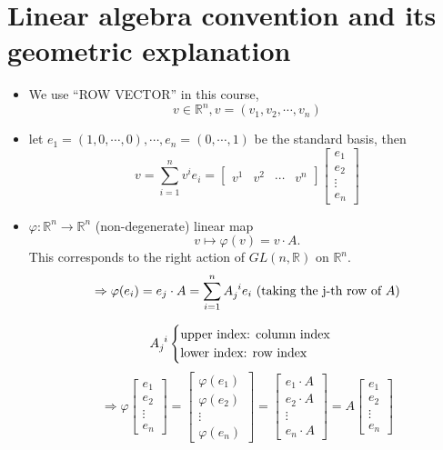 \section{Linear algebra convention and its geometric explanation}
\begin{itemize}
    \item We use ``ROW VECTOR'' in this course, \ie\
    \[v\in \mathbb{R}^n, v=(v_1,v_2,\cdots,v_n)\]
    \item let $e_1=(1,0,\cdots,0),\cdots,e_n=(0,\cdots,1)$ be the standard basis, then 
    \[v=\sum_{i=1}^nv^i e_i=
    \begin{bmatrix}
        v^1& v^2& \cdots & v^n
    \end{bmatrix}
    \begin{bmatrix}
        e_1\\
        e_2\\
        \vdots\\
        e_n
    \end{bmatrix}
    \]
    \item $\varphi\colon \mathbb{R}^n\to \mathbb{R}^n$ (non-degenerate) linear map
    \[v\mapsto \varphi(v)=v\cdot A.\]
    This corresponds to the right action of $GL(n,\mathbb{R})$ on $\mathbb{R}^n$.
    \[\Rightarrow \varphi(e_i)=e_j \cdot A=\sum_{i=1}^n A\indices{_j^i}e_i\text{ (taking the j-th row of }A\text{)}\]
    
    \[A\indices{_j^i}\begin{cases}
        \text{upper index: column index}\\
        \text{lower index: row index}
    \end{cases}\]
    \[\Rightarrow \varphi\begin{bmatrix}
        e_1\\
        e_2\\
        \vdots\\
        e_n
    \end{bmatrix}=\begin{bmatrix}
       \varphi( e_1)\\
        \varphi (e_2)\\
        \vdots\\
        \varphi(e_n)
    \end{bmatrix}=\begin{bmatrix}
        e_1\cdot A\\
        e_2\cdot A\\
        \vdots\\
        e_n\cdot A
    \end{bmatrix}=
    A \begin{bmatrix}
        e_1\\
        e_2\\
        \vdots\\
        e_n
    \end{bmatrix}\]
\end{itemize}
